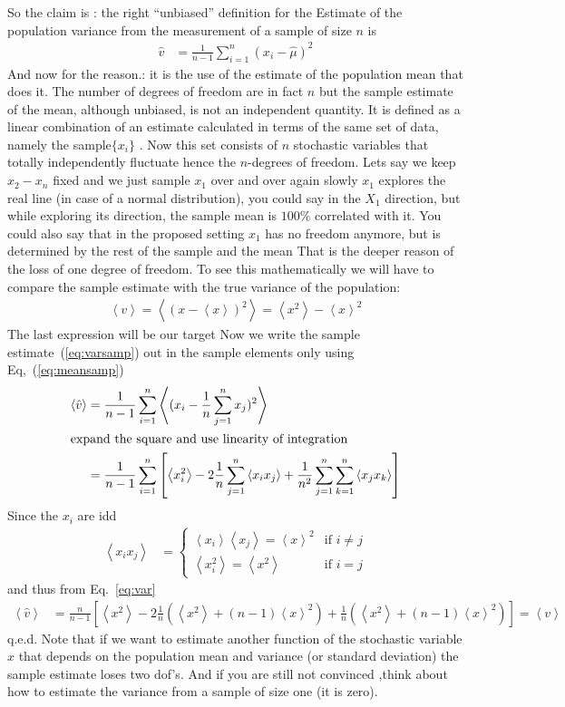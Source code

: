 \documentclass[a4paper,10pt]{article}
\newcommand{\vev}[1]{ \left\langle #1 \right\rangle}
\begin{document}
So the claim is : the right ``unbiased'' definition for  the Estimate of the population variance from the measurement of a sample of size $n$  is
\begin{align}
  \hat{v} &= \frac{1}{n-1}\sum_{i=1}^n (x_i-\hat{\mu})^2 \label{eq:varsamp}
\end{align}
And now for the reason.: it is the use of the estimate of the population mean that does it. The number of degrees of freedom are in fact $n$ but the sample estimate of the mean, although unbiased, is not an independent quantity. It is defined as a linear combination of an estimate calculated in terms of the same set of data, namely the sample$\{x_i\}$ .  Now this set consists of $n$ stochastic variables that totally independently fluctuate hence the $n$-degrees of freedom. Lets say we keep $x_2-x_n$ fixed  and we just sample $x_1$ over and over again slowly $x_1$ explores the real line (in case of a normal distribution), you could say in the $X_1$ direction, but while exploring its direction, the sample mean is $100\%$  correlated with it.  You could also say that in the proposed setting $x_1$ has no freedom anymore, but is determined by the rest of the sample and the mean
That is the deeper reason of the loss of one degree of freedom. To see this mathematically we will have to compare the sample estimate with the true variance of the population:
\begin{align}
  \vev{v}= \vev{(x-\vev{x})^2} = \vev{x^2}-\vev{x}^2\label{eq:var}
\end{align}
The last expression will be our target
Now we  write the sample  estimate~(\ref{eq:varsamp}) out in the sample elements only using Eq,~(\ref{eq:meansamp})
\begin{align*}
 \vev{\hat{v}} & =   \frac{1}{n-1}\sum_{i=1}^n \vev{(x_i- \frac{1}{n}\sum_{j=1}^nx_j)^2}\\
 \intertext{expand the square and use linearity of  integration}
  & =   \frac{1}{n-1}\sum_{i=1}^n\left[ \vev{x_i^2}- 2\frac{1}{n}\sum_{j=1}^n\vev{x_ix_j}   +\frac{1}{n^2}\sum_{j=1}^n\sum_{k=1}^n\vev{x_jx_k}\right]
\end{align*}
Since the $x_i$ are idd
\begin{align*}
\vev{x_ix_j}&=\begin{cases}
               \vev{x_i}\vev{x_j}= \vev{x}^2& \text{if }i\neq j\\
                \vev{x_i^2}=\vev{x^2}&  \text{if }i=j
              \end{cases}
\end{align*}
and thus from Eq.~\eqref{eq:var}
\begin{align*}
  \vev{\hat{v}} & =    \frac{n}{n-1}\left[ \vev{x^2}- 2\frac{1}{n}(\vev{x^2}+(n-1)\vev{x}^2)   +\frac{1}{n}(\vev{x^2}+(n-1)\vev{x}^2)\right] =\vev{v}
\end{align*}
q.e.d.
Note that if we want to estimate another function of the stochastic variable $x$ that depends on the population mean and variance (or standard deviation) the sample estimate loses two dof's. 
And if you are still not convinced ,think about how to estimate the variance from a sample of size one (it is zero).
\end{document}
